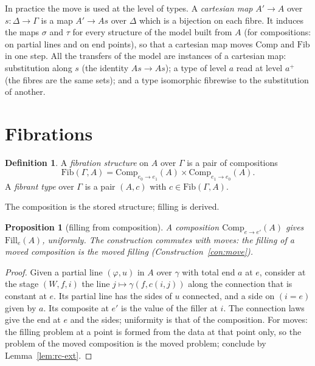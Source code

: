 \documentclass[11pt]{article}
\newcommand{\Fib}{\mathrm{Fib}}
\newcommand{\Comp}{\mathrm{Comp}}
\theoremstyle{plain}
\newtheorem{proposition}[theorem]{Proposition}
\theoremstyle{definition}
\newtheorem{definition}[theorem]{Definition}
\theoremstyle{remark}
\begin{document}
In practice the move is used at the level of types. A \emph{cartesian
map} $A'\to A$ over $s:\Delta\to\Gamma$ is a map $A'\to As$ over
$\Delta$ which is a bijection on each fibre. It induces the maps $\sigma$
and $\tau$ for every structure of the model built from $A$ (for
compositions: on partial lines and on end points), so that a cartesian
map moves $\Comp$ and $\Fib$ in one step. All the transfers of the model
are instances of a cartesian map: substitution along $s$ (the identity
$As\to As$); a type of level $a$ read at level $a^+$ (the fibres are
the same sets); and a type isomorphic fibrewise to the substitution of
another.

\section{Fibrations}\label{sec:fib}

\begin{definition}
A \emph{fibration structure} on $A$ over $\Gamma$ is a pair of
compositions
\[
\Fib(\Gamma,A)=\Comp_{e_0\to e_1}(A)\times\Comp_{e_1\to e_0}(A).
\]
A \emph{fibrant type} over $\Gamma$ is a pair $(A,c)$ with
$c\in\Fib(\Gamma,A)$.
\end{definition}

The composition is the stored structure; filling is derived.

\begin{proposition}[filling from composition]\label{prop:fill}
A composition $\Comp_{e\to e'}(A)$ gives $\mathrm{Fill}_e(A)$, uniformly.
The construction commutes with moves: the filling of a moved composition
is the moved filling (Construction~\ref{con:move}).
\end{proposition}

\begin{proof}
Given a partial line $(\varphi,u)$ in $A$ over $\gamma$ with total end
$a$ at $e$, consider at the stage $(W,f,i)$ the line
$j\mapsto\gamma(f,c(i,j))$ along the connection that is constant at $e$.
Its partial line has the sides of $u$ connected, and a side on $(i=e)$
given by $a$. Its composite at $e'$ is the value of the filler at $i$.
The connection laws give the end at $e$ and the sides; uniformity is that
of the composition. For moves: the filling problem at a point is formed
from the data at that point only, so the problem of the moved composition
is the moved problem; conclude by Lemma~\ref{lem:rc-ext}.
\end{proof}
\end{document}
